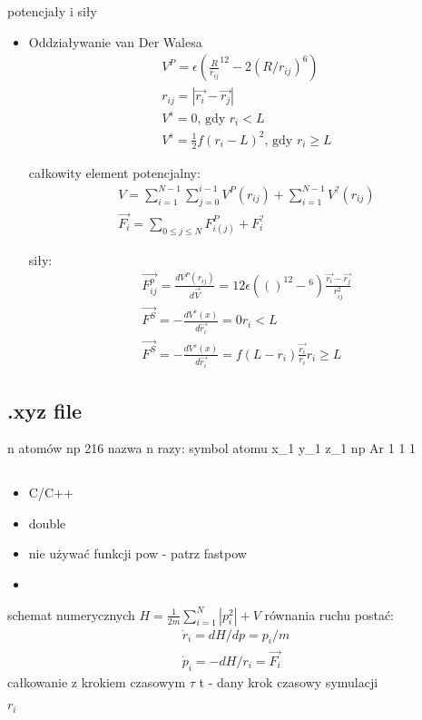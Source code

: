 \documentclass[a4paper,10pt]{article}
\begin{document}
potencjały i siły
\begin{itemize}
 \item Oddziaływanie van Der Walesa
\begin{gather*}
V^P = \epsilon (\frac{R}{r_{ij}}^{12} - 2 (R/r_{ij}) ^ 6) \\
r_{ij} = | \vec{r_i} - \vec{r_j}| \\ 
V^s = 0 \text{, gdy } r_i < L \\
V^s = \frac{1}{2} f ( r_i - L ) ^2 \text{, gdy } r_i \ge L
\end{gather*}

całkowity element potencjalny:
\begin{gather*}
V = \sum_{i=1}^{N-1}\sum_{j=0}^{i - 1} V^P(r_{ij}) + \sum_{i=1}^{N-1}V^? (r_{ij}) \\
\vec{F_i} = \sum_{0\le j \le N} F_{i(j)}^P + F_i^?
\end{gather*}

siły:
\begin{gather*}
\vec{F^p_{ij}} = \frac{dV^P(r_{ij})}{d\vec{V}} = 12 \epsilon (()^{12} - {}^6) \frac{\vec{r_i} - \vec{r_j}}{r_{ij}^2} \\
\vec{F^S} = - \frac{dV^s(x)}{d\vec{r_i}} = 0 r_i < L \\
\vec{F^S} = - \frac{dV^s(x)}{d\vec{r_i}} = f(L-r_i)\frac{\vec{r_i}}{r_i} r_i \ge L
\end{gather*}
\end{itemize}

\subsection{.xyz file}
n atomów np 216
nazwa
n razy:
  symbol atomu x\_1 y\_1 z\_1 np Ar 1 1 1

\subsection{}
\begin{itemize}
 \item C/C++
 \item double
 \item nie używać funkcji pow - patrz fastpow
 \item 
\end{itemize}


schemat numerycznych
$H = \frac{1}{2m} \sum_{i=1}^N   |p_i^2| + V$
równania ruchu postać:
\begin{gather*}
\dot{r}_i = dH/dp = p_i/m \\
\dot{p}_i = -dH/r_i = \vec{F_i}
\end{gather*}  
całkowanie z krokiem czasowym $\tau$
  t - dany krok czasowy symulacji
  
  $r_i$
\end{document}

